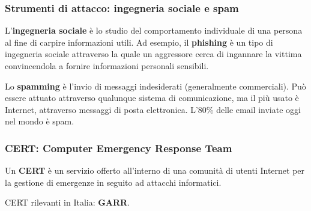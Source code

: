         \subsubsection{Strumenti di attacco: ingegneria sociale e spam}
            L'\textbf{ingegneria sociale} è lo studio del comportamento individuale di una persona al fine di carpire informazioni utili. Ad esempio, il \textbf{phishing} è un tipo di ingegneria sociale attraverso la quale un aggressore cerca di ingannare la vittima convincendola a fornire informazioni personali sensibili.
        
            Lo \textbf{spamming} è l'invio di messaggi indesiderati (generalmente commerciali). Può essere attuato attraverso qualunque sistema di comunicazione, ma il più usato è Internet, attraverso messaggi di posta elettronica. L'80\% delle email inviate oggi nel mondo è spam.

        \subsubsection{CERT: Computer Emergency Response Team}
            Un \textbf{CERT} è un servizio offerto all'interno di una comunità di utenti Internet per la gestione di emergenze in seguito ad attacchi informatici.
        
            CERT rilevanti in Italia: \textbf{GARR}.

